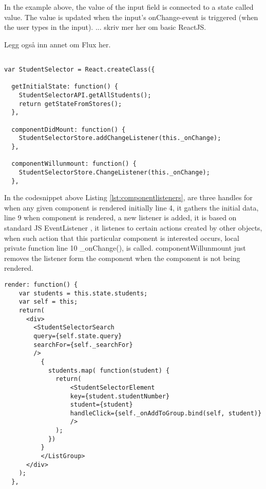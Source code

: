 {In the example above, the value of the input field is connected to a state called value. The value is updated when the input's onChange-event is triggered (when the user types in the input). ... skriv mer her om basic ReactJS.

Legg også inn annet om Flux her.


\begin{lstlisting}[caption=React setup for listening to cache/data store, label=lst:componentlisteners]

var StudentSelector = React.createClass({

  getInitialState: function() {
    StudentSelectorAPI.getAllStudents();
    return getStateFromStores();
  },

  componentDidMount: function() {
    StudentSelectorStore.addChangeListener(this._onChange);
  },

  componentWillunmount: function() {
    StudentSelectorStore.ChangeListener(this._onChange);
  },

\end{lstlisting}

In the codesnippet above Listing \ref{lst:componentlisteners}, are three handles for when any given component  is rendered initially line 4, it gathers the initial data, line 9 when component is rendered, a new listener is added, it is based on standard JS EventListener \cite{eventlistener}, it listenes to certain actions created by other objects, when such action that this particular component is interested occurs, local private function line 10 \_onChange(), is called. componentWillunmount just removes the listener form the component when the component is not being rendered.
\newpage
\begin{lstlisting}[caption=React render method rendering when the state is updated, label=lst:reactrender]
  render: function() {
    var students = this.state.students;
    var self = this;
    return(
      <div>
        <StudentSelectorSearch
        query={self.state.query}
        searchFor={self._searchFor}
        />
          {
            students.map( function(student) {
              return(
                  <StudentSelectorElement
                  key={student.studentNumber}
                  student={student}
                  handleClick={self._onAddToGroup.bind(self, student)}
                  />
              );
            })
          }
          </ListGroup>
      </div>
    );
  },
\end{lstlisting}

}
